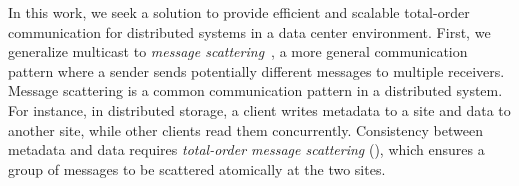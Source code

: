 In this work, we seek a solution to provide efficient and scalable total-order communication for distributed systems in a data center environment.
First, we generalize multicast to \textit{message scattering}~\cite{}, a more general communication pattern where a sender sends potentially different messages to multiple receivers.
Message scattering is a common communication pattern in a distributed system.
For instance, in distributed storage, a client writes metadata to a site and data to another site, while other clients read them concurrently.
Consistency between metadata and data requires  \textit{total-order message scattering} (\sys), which ensures a group of messages to be scattered atomically at the two sites.

 



